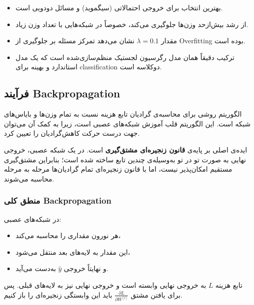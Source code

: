 \documentclass{article}
\begin{document}
\begin{itemize}
	\item {} بهترین انتخاب برای خروجی احتمالاتی (سیگموید) و مسائل دودویی است.
	\item {} از رشد بیش‌ازحد وزن‌ها جلوگیری می‌کند، خصوصاً در شبکه‌هایی با تعداد وزن زیاد.
	\item مقدار \(\lambda = 0.1\) نشان می‌دهد تمرکز مسئله بر جلوگیری از Overfitting بوده است.
	\item ترکیب  دقیقاً همان مدل رگرسیون لجستیک منظم‌سازی‌شده است که یک مدل استاندارد و بهینه برای classification دوکلاسه است.
\end{itemize}



\subsection{فرآیند Backpropagation}

الگوریتم  روشی برای محاسبه‌ی گرادیان تابع هزینه نسبت به تمام وزن‌ها و بایاس‌های شبکه است.  
این الگوریتم قلب آموزش شبکه‌های عصبی است، زیرا به کمک آن می‌توان جهت درست حرکت کاهش‌گرادیان را تعیین کرد.

ایده‌ی اصلی  بر پایه‌ی \textbf{قانون زنجیره‌ای مشتق‌گیری } است.  
در یک شبکه عصبی، خروجی نهایی به صورت تو در تو به‌وسیله‌ی چندین تابع ساخته شده است؛ بنابراین مشتق‌گیری مستقیم امکان‌پذیر نیست، اما با قانون زنجیره‌ای تمام گرادیان‌ها مرحله به مرحله محاسبه می‌شوند.

\subsubsection*{منطق کلی Backpropagation}

در شبکه‌های عصبی:
\begin{itemize}
	\item هر نورون مقداری را محاسبه می‌کند،
	\item این مقدار به لایه‌های بعد منتقل می‌شود،
	\item و نهایتاً خروجی \(\hat{y}\) به‌دست می‌آید.
\end{itemize}

تابع هزینه \(L\) به خروجی نهایی وابسته است و خروجی نهایی نیز به لایه‌های قبلی.  
پس برای یافتن مشتق \( \frac{\partial L}{\partial W^{[l]}} \) باید این وابستگی زنجیره‌ای را باز کنیم.
\end{document}
